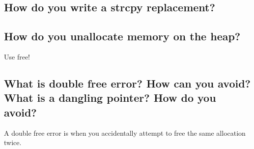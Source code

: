 \begin{Shaded}
\begin{Highlighting}[]
\end{Highlighting}
\end{Shaded}

\subsection{How do you write a strcpy
replacement?}\label{how-do-you-write-a-strcpy-replacement}

\begin{Shaded}
\begin{Highlighting}[]
      \NormalTok{);}
    
\NormalTok{\}}
\end{Highlighting}
\end{Shaded}

\subsection{How do you unallocate memory on the
heap?}\label{how-do-you-unallocate-memory-on-the-heap}

Use free!

\begin{Shaded}
\begin{Highlighting}[]
  \NormalTok{(}\NormalTok{));}
\NormalTok{;}
\end{Highlighting}
\end{Shaded}

\subsection{What is double free error? How can you avoid? What is a
dangling pointer? How do you
avoid?}\label{what-is-double-free-error-how-can-you-avoid-what-is-a-dangling-pointer-how-do-you-avoid}

A double free error is when you accidentally attempt to free the same
allocation twice.


